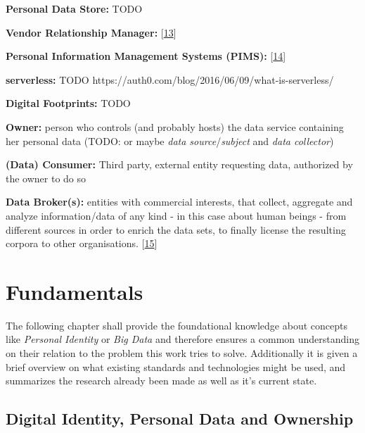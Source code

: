 \documentclass[12pt,english,a4paper,titlepage,cleardoublepage=empty,dottedtoc]{report}
\begin{document}
\textbf{Personal Data Store:} TODO

\textbf{Vendor Relationship Manager:}
{[}\protect\hyperlink{ref-web_2010_projectvrm-wiki_about-vrm}{13}{]}

\textbf{Personal Information Management Systems (PIMS):}
{[}\protect\hyperlink{ref-web_2010_projectvrm-wiki_pims-example-list}{14}{]}

\textbf{serverless:} TODO
https://auth0.com/blog/2016/06/09/what-is-serverless/

\textbf{Digital Footprints:} TODO

\textbf{Owner:} person who controls (and probably hosts) the data
service containing her personal data (TODO: or maybe \emph{data
source}/\emph{subject} and \emph{data collector})

\textbf{(Data) Consumer:} Third party, external entity requesting data,
authorized by the owner to do so

\textbf{Data Broker(s):} entities with commercial interests, that
collect, aggregate and analyze information/data of any kind - in this
case about human beings - from different sources in order to enrich the
data sets, to finally license the resulting corpora to other
organisations.
{[}\protect\hyperlink{ref-report_2014_data-brokers}{15}{]}

\chapter{Fundamentals}\label{fundamentals}

The following chapter shall provide the foundational knowledge about
concepts like \emph{Personal Identity} or \emph{Big Data} and therefore
ensures a common understanding on their relation to the problem this
work tries to solve. Additionally it is given a brief overview on what
existing standards and technologies might be used, and summarizes the
research already been made as well as it's current state.

\section{Digital Identity, Personal Data and
Ownership}\label{digital-identity-personal-data-and-ownership}
\end{document}
